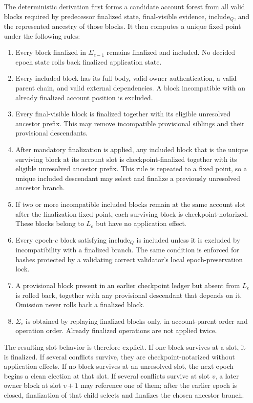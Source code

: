 \documentclass[10pt,twocolumn]{article}
\newcommand{\Include}{\mathrm{include}}
\begin{document}
The deterministic derivation first forms a candidate account forest from all valid blocks required by predecessor finalized state, final-visible evidence, $\Include_Q$, and the represented ancestry of those blocks. It then computes a unique fixed point under the following rules:
\begin{enumerate}
\item Every block finalized in $\Sigma_{e-1}$ remains finalized and included. No decided epoch state rolls back finalized application state.
\item Every included block has its full body, valid owner authentication, a valid parent chain, and valid external dependencies. A block incompatible with an already finalized account position is excluded.
\item Every final-visible block is finalized together with its eligible unresolved ancestor prefix. This may remove incompatible provisional siblings and their provisional descendants.
\item After mandatory finalization is applied, any included block that is the unique surviving block at its account slot is checkpoint-finalized together with its eligible unresolved ancestor prefix. This rule is repeated to a fixed point, so a unique included descendant may select and finalize a previously unresolved ancestor branch.
\item If two or more incompatible included blocks remain at the same account slot after the finalization fixed point, each surviving block is checkpoint-notarized. These blocks belong to $L_e$ but have no application effect.
\item Every epoch-$e$ block satisfying $\Include_Q$ is included unless it is excluded by incompatibility with a finalized branch. The same condition is enforced for hashes protected by a validating correct validator's local epoch-preservation lock.
\item A provisional block present in an earlier checkpoint ledger but absent from $L_e$ is rolled back, together with any provisional descendant that depends on it. Omission never rolls back a finalized block.
\item $\Sigma_e$ is obtained by replaying finalized blocks only, in account-parent order and operation order. Already finalized operations are not applied twice.
\end{enumerate}

The resulting slot behavior is therefore explicit. If one block survives at a slot, it is finalized. If several conflicts survive, they are checkpoint-notarized without application effects. If no block survives at an unresolved slot, the next epoch begins a clean election at that slot. If several conflicts survive at slot $v$, a later owner block at slot $v+1$ may reference one of them; after the earlier epoch is closed, finalization of that child selects and finalizes the chosen ancestor branch.
\end{document}
